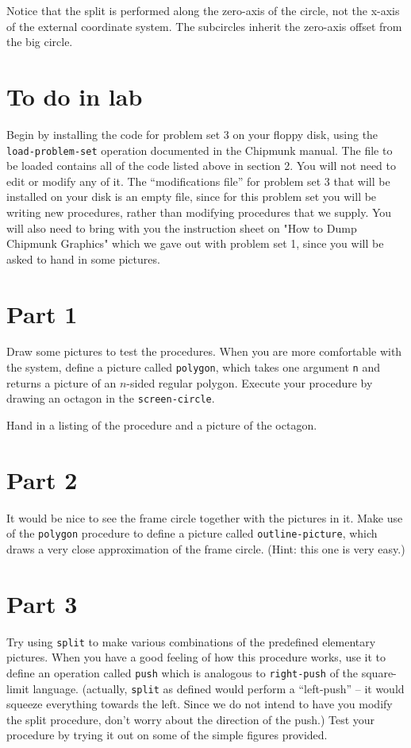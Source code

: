 Notice that the split is performed along the zero-axis of the circle,
not the x-axis of the external coordinate system.  The subcircles
inherit the zero-axis offset from the big circle.

\section{To do in lab}

Begin by installing the code for problem set 3 on your floppy disk,
using the {\tt load-problem-set} operation documented in the Chipmunk
manual.  The file to be loaded contains all of the code listed above
in section 2.  You will not need to edit
or modify any of it.  The ``modifications file'' for problem set 3 that
will be installed on your disk is an empty file, since for this
problem set you will be writing new procedures, rather than modifying
procedures that we supply.  You will also need to bring with you the
instruction sheet on "How to Dump Chipmunk Graphics" which we gave out
with problem set 1, since you will be asked to hand in some pictures.

\section{Part 1}

Draw some pictures to test the procedures.  When you are more
comfortable with the system, define a picture called {\tt polygon},
which takes one argument {\tt n} and returns a picture of an $n$-sided
regular polygon.  Execute your procedure by drawing an octagon in
the {\tt screen-circle}.

Hand in a listing of the procedure and a picture of the octagon.

\section{Part 2}

It would be nice to see the frame circle together with the pictures
in it.  Make use of the {\tt polygon} procedure to define a picture
called {\tt outline-picture}, which draws a very close approximation
of the frame circle.  (Hint: this one is very easy.)

\section{Part 3}

Try using {\tt split} to make various combinations of the predefined
elementary pictures.  When you have a good feeling of how this 
procedure works, use it to define an operation called {\tt push} which
is analogous to {\tt right-push} of the square-limit language.
(actually, {\tt split} as defined would perform a ``left-push''
-- it would
squeeze everything towards the left.  Since we do not intend to have
you modify the split procedure, don't worry about the direction of
the push.)  Test your procedure by trying it out on some of the simple
figures provided.

